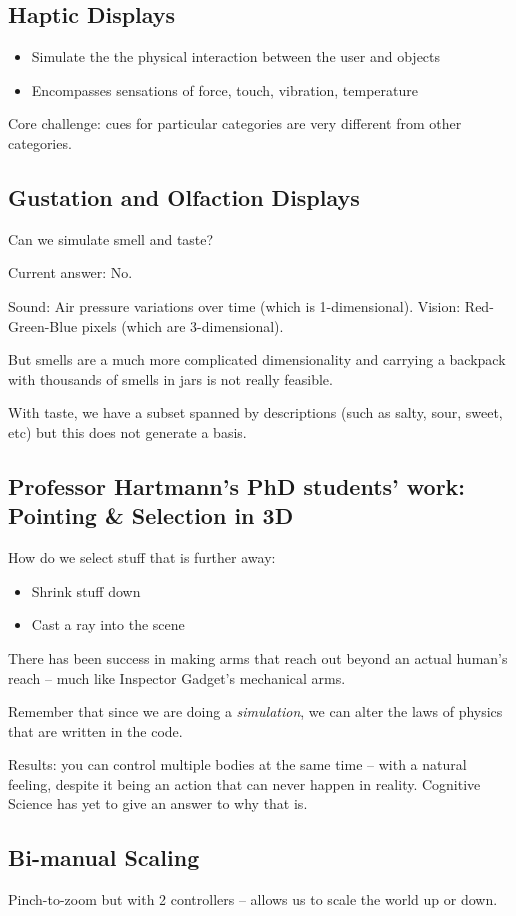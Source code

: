 \subsection{Haptic Displays}
\begin{itemize}
    \item Simulate the the physical interaction between the user and objects
    \item Encompasses sensations of force, touch, vibration, temperature
\end{itemize}
Core challenge: cues for particular categories are very different from other categories.

\subsection{Gustation and Olfaction
Displays}
\begin{shaded}
Can we simulate smell and taste?
\end{shaded}
Current answer: No.

Sound: Air pressure variations over time (which is 1-dimensional).
Vision: Red-Green-Blue pixels (which are 3-dimensional).

But smells are a much more complicated dimensionality and carrying a backpack with thousands of smells in jars is not really feasible.

With taste, we have a subset spanned by descriptions (such as salty, sour, sweet, etc) but this does not generate a basis.

\subsection{Professor Hartmann's PhD students' work: Pointing \& Selection in 3D}
How do we select stuff that is further away:
\begin{itemize}
    \item Shrink stuff down
    \item Cast a ray into the scene
\end{itemize}
There has been success in making arms that reach out beyond an actual human's reach -- much like Inspector Gadget's mechanical arms.

Remember that since we are doing a \textit{simulation}, we can alter the laws of physics that are written in the code.

Results: you can control multiple bodies at the same time -- with a natural feeling, despite it being an action that can never happen in reality. Cognitive Science has yet to give an answer to why that is.

\subsection{Bi-manual Scaling}
Pinch-to-zoom but with 2 controllers -- allows us to scale the world up or down.
